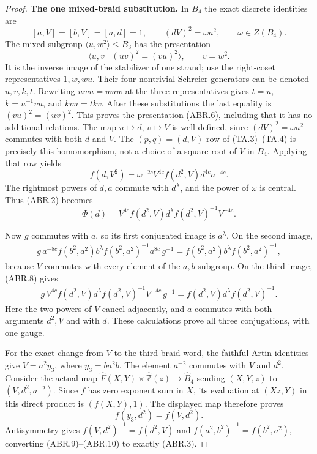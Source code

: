 \begin{proof}
\par\medskip\noindent\textbf{The one mixed-braid substitution.}\quad
In $B_4$ the exact discrete identities are
\[
 [a,V]=[b,V]=[a,d]=1,
 \qquad (dV)^2=\omega a^2,
 \qquad \omega\in Z(B_4).                               \tag{ABR.5}
\]
The mixed subgroup $\langle u,w^2\rangle\leq B_3$
has the presentation
\[
 \langle u,v\mid(uv)^2=(vu)^2\rangle,
 \qquad v=w^2.                                         \tag{ABR.6}
\]
It is the inverse image of the stabilizer of one strand;
use the right-coset representatives $1,w,wu$.  Their four
nontrivial Schreier generators can be denoted $u,v,k,t$.
Rewriting $uwu=wuw$ at the three representatives gives
$t=u$, $k=u^{-1}vu$, and $kvu=t kv$.
After these substitutions the last equality is
$(vu)^2=(uv)^2$.  This proves the presentation (ABR.6),
including that it has no additional relations.
The map $u\mapsto d$, $v\mapsto V$ is well-defined, since
$(dV)^2=\omega a^2$ commutes with both $d$ and $V$.
The $(p,q)=(d,V)$ row of (TA.3)--(TA.4) is precisely this
homomorphism, not a choice of a square root of $V$ in $B_4$.
Applying that row yields
\[
 f(d,V^2)=\omega^{-2c}V^{4c}
                f(d^2,V)d^{4c}a^{-4c}.                 \tag{ABR.7}
\]
The rightmost powers of $d,a$ commute with $d^\lambda$,
and the power of $\omega$ is central.  Thus (ABR.2) becomes
\[
 \Phi(d)=V^{4c}f(d^2,V)d^\lambda
                     f(d^2,V)^{-1}V^{-4c}.             \tag{ABR.8}
\]

Now $g$ commutes with $a$, so its first conjugated image is
$a^\lambda$.  On the second image,
\[
\begin{split}
 g\,a^{-8c}f(b^2,a^2)b^\lambda
                f(b^2,a^2)^{-1}a^{8c}\,g^{-1}
 =f(b^2,a^2)b^\lambda f(b^2,a^2)^{-1},
\end{split}                                                     \tag{ABR.9}
\]
because $V$ commutes with every element of the $a,b$ subgroup.
On the third image, (ABR.8) gives
\[
\begin{split}
 g\,V^{4c}f(d^2,V)d^\lambda
                  f(d^2,V)^{-1}V^{-4c}\,g^{-1}
 =f(d^2,V)d^\lambda f(d^2,V)^{-1}.
\end{split}                                                     \tag{ABR.10}
\]
Here the two powers of $V$ cancel adjacently, and $a$ commutes
with both arguments $d^2,V$ and with $d$.
These calculations prove all three conjugations, with one gauge.

For the exact change from $V$ to the third braid word, the
faithful Artin identities give $V=a^2y_3$, where
$y_3=ba^2b$.  The element $a^{-2}$ commutes with $V$ and $d^2$.
Consider the actual map
$\widehat F(X,Y)\times\widehat{\mathbb Z}(z)
 \to\widehat B_4$ sending $(X,Y,z)$ to $(V,d^2,a^{-2})$.
Since $f$ has zero exponent sum in $X$, its evaluation at
$(Xz,Y)$ in this direct product is $(f(X,Y),1)$.
The displayed map therefore proves
\[
                      f(y_3,d^2)=f(V,d^2).              \tag{ABR.11}
\]
Antisymmetry gives $f(V,d^2)^{-1}=f(d^2,V)$ and
$f(a^2,b^2)^{-1}=f(b^2,a^2)$, converting (ABR.9)--(ABR.10)
to exactly (ABR.3).


\end{proof}
